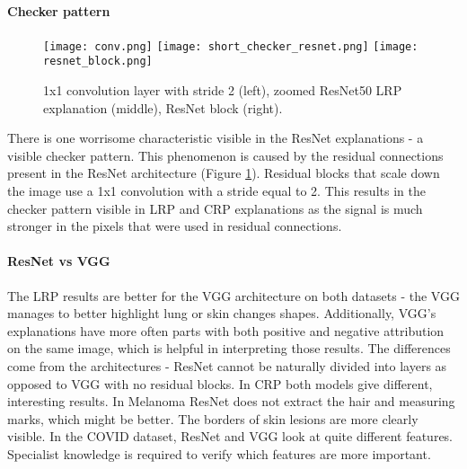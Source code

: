 \documentclass[twoside,11pt]{article}
\begin{document}
\paragraph{Checker pattern}
\begin{figure}[t]
    \centering
    \texttt{[image: conv.png]} \quad
    \texttt{[image: short\_checker\_resnet.png]} \quad
    \texttt{[image: resnet\_block.png]}
    \caption{1x1 convolution layer with stride 2 (left), zoomed ResNet50 LRP explanation (middle), ResNet block (right).}
    \label{fig:resnet_residual}
\end{figure}
There is one worrisome characteristic visible in the ResNet explanations - a visible checker pattern. 
This phenomenon is caused by the residual connections present in the ResNet architecture (Figure \ref{fig:resnet_residual}).
Residual blocks that scale down the image use a 1x1 convolution with a stride equal to 2.
This results in the checker pattern visible in LRP and CRP explanations as the signal is much stronger in the pixels that were used in residual connections.

\paragraph{ResNet vs VGG}
The LRP results are better for the VGG architecture on both datasets - the VGG manages to better highlight lung or skin changes shapes. Additionally, VGG's explanations have more often parts with both positive and negative attribution on the same image, which is helpful in interpreting those results. The differences come from the architectures - ResNet cannot be naturally divided into layers as opposed to VGG with no residual blocks. In CRP both models give different, interesting results. In Melanoma ResNet does not extract the hair and measuring marks, which might be better. The borders of skin lesions are more clearly visible. In the COVID dataset, ResNet and VGG look at quite different features. Specialist knowledge is required to verify which features are more important.

\end{document}
